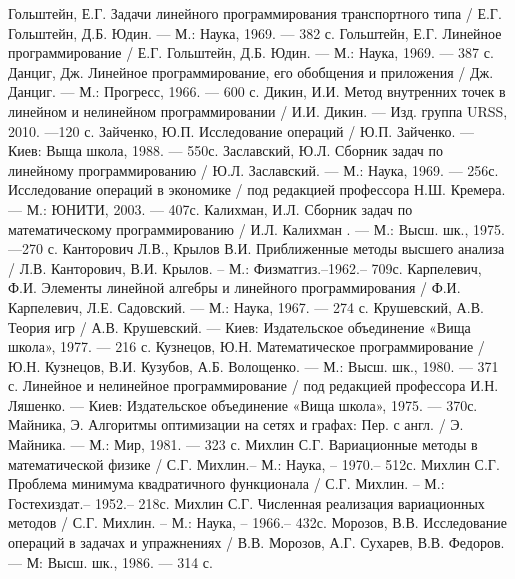 \begin{thebibliography}{99}
Гольштейн, Е.Г. Задачи линейного программирования транспортного типа / Е.Г. Гольштейн, Д.Б. Юдин. — М.: Наука, 1969. — 382 с.
Гольштейн, Е.Г. Линейное программирование / Е.Г. Гольштейн, Д.Б. Юдин. — М.: Наука, 1969. — 387 с.
Данциг, Дж. Линейное программирование, его обобщения и приложения / Дж. Данциг. — М.: Прогресс, 1966. — 600 с.
Дикин, И.И. Метод внутренних точек в линейном и нелинейном программировании / И.И. Дикин. — Изд. группа URSS, 2010. —120 с.
Зайченко, Ю.П. Исследование операций / Ю.П. Зайченко. — Киев: Выща школа, 1988. — 550с.
Заславский, Ю.Л. Сборник задач по линейному программированию / Ю.Л. Заславский. — М.: Наука, 1969. — 256с.
Исследование операций в экономике / под редакцией профессора Н.Ш. Кремера. — М.: ЮНИТИ, 2003. — 407с.
Калихман, И.Л. Сборник задач по математическому программированию / И.Л. Калихман . — М.: Высш. шк., 1975. —270 с.
Канторович Л.В., Крылов В.И. Приближенные методы высшего анализа / Л.В. Канторович, В.И. Крылов. – М.: Физматгиз.–1962.– 709с.
Карпелевич, Ф.И. Элементы линейной алгебры и линейного программирования / Ф.И. Карпелевич, Л.Е. Садовский. — М.: Наука, 1967. — 274 с.
Крушевский, А.В. Теория игр / А.В. Крушевский. — Киев: Издательское объединение «Вища школа», 1977. — 216 с.
Кузнецов, Ю.Н. Математическое программирование / Ю.Н. Кузнецов,  В.И. Кузубов,  А.Б. Волощенко. — М.: Высш. шк., 1980. — 371 с.
Линейное и нелинейное программирование / под редакцией профессора И.Н. Ляшенко. — Киев: Издательское объединение «Вища школа», 1975. — 370с.
Майника, Э. Алгоритмы оптимизации на сетях и графах: Пер. с англ. / Э. Майника. — М.: Мир, 1981. — 323 с.
Михлин С.Г. Вариационные методы в математической физике / С.Г. Михлин.– М.: Наука, – 1970.– 512с.
Михлин С.Г. Проблема минимума квадратичного функционала / С.Г. Михлин. – М.: Гостехиздат.– 1952.– 218с.
Михлин С.Г. Численная реализация вариационных методов / С.Г. Михлин. – М.: Наука, – 1966.– 432с.
Морозов, В.В. Исследование операций в задачах и упражнениях / В.В. Морозов,  А.Г. Сухарев,  В.В. Федоров. — М: Высш. шк., 1986. — 314 с.

\end{thebibliography}
